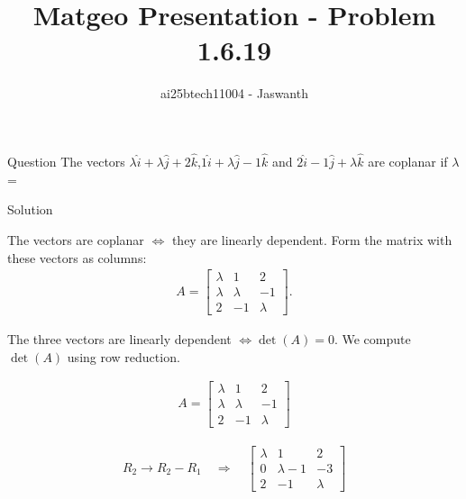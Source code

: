 \documentclass{beamer}
\title{Matgeo Presentation - Problem 1.6.19}
\author{ai25btech11004 - Jaswanth}
\numberwithin{equation}{section}
\theoremstyle{remark}
\begin{document}
\frame{\titlepage}
\begin{frame}{Question}
The vectors $\lambda\hat{i}+\lambda\hat{j}+2\hat{k}$,$1\hat{i}+\lambda\hat{j}-1\hat{k}$ and $2\hat{i}-1\hat{j}+\lambda\hat{k}$ are coplanar if $\lambda$ = \\
\end{frame}


\begin{frame}{Solution}
   
The vectors are coplanar $\iff$ they are linearly dependent.  
Form the matrix with these vectors as columns:
\begin{align}
A = 
\begin{bmatrix}
\lambda & 1 & 2 \\[4pt]
\lambda & \lambda & -1 \\[4pt]
2 & -1 & \lambda
\end{bmatrix}.
\end{align}

The three vectors are linearly dependent $\iff \det(A)=0$.  
We compute $\det(A)$ using row reduction.

\begin{align}
A = 
\begin{bmatrix}
\lambda & 1 & 2 \\
\lambda & \lambda & -1 \\
2 & -1 & \lambda
\end{bmatrix}
\end{align}

\begin{align}
R_2 \to R_2 - R_1 \quad \Rightarrow \quad
\begin{bmatrix}
\lambda & 1 & 2 \\
0 & \lambda-1 & -3 \\
2 & -1 & \lambda
\end{bmatrix}
\end{align}
\end{frame}
\end{document}
